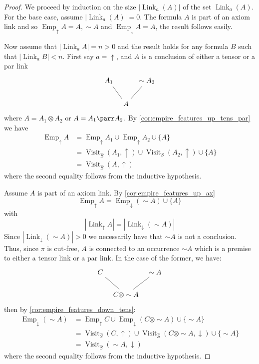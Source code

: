 \documentclass[12pt]{article}
\theoremstyle{plain}
\theoremstyle{definition}
\newcommand{\negation}{\sim}
\begin{document}
\begin{proof}
We proceed by induction on the size $|\operatorname{Link}_a(A)|$ of the set $\operatorname{Link}_a(A)$. For the base case, assume $|\operatorname{Link}_a(A)| = 0$. The formula $A$ is part of an axiom link and so $\operatorname{Emp}_{\uparrow}A = A, \negation A$ and $\operatorname{Emp}_{\downarrow}A = A$, the result follows easily.

Now assume that $|\operatorname{Link}_a A| = n > 0$ and the result holds for any formula $B$ such that $|\operatorname{Link}_aB| < n$. First say $a = \uparrow$, and $A$ is a conclusion of either a tensor or a par link
\[
\begin{tikzcd}[column sep = tiny]
A_1\arrow[dr,dash] && \negation A_2\arrow[dl,dash]\\
& A
\end{tikzcd}
\]
where $A = A_1 \otimes A_2$ or $A = A_1 \parr A_2$. By \eqref{cor:empire_features_up_tens_par} we have
\begin{align*}
    \operatorname{Emp}_{\uparrow}A &= \operatorname{Emp}_{\uparrow}A_1 \cup \operatorname{Emp}_{\uparrow}A_2 \cup \lbrace A\rbrace\\
    &= \operatorname{Visit}_{\hat{S}}(A_1,\uparrow) \cup \operatorname{Visit}_S(A_2,\uparrow) \cup \lbrace A \rbrace\\
    &= \operatorname{Visit}_{\hat{S}}(A, \uparrow)
\end{align*}
where the second equality follows from the inductive hypothesis.

Assume $A$ is part of an axiom link. By \eqref{cor:empire_features_up_ax}
\begin{equation}
    \operatorname{Emp}_{\uparrow}A = \operatorname{Emp}_{\downarrow}(\negation A) \cup \lbrace A \rbrace
\end{equation}
with
\begin{equation}
    |\operatorname{Link}_{\uparrow}A| = |\operatorname{Link}_{\downarrow}(\negation A)|
\end{equation}
Since $|\operatorname{Link}_{\downarrow}(\negation A)| > 0$ we necessarily have that $\negation A$ is not a conclusion. Thus, since $\pi$ is cut-free, $A$ is connected to an occurrence $\negation A$ which is a premise to either a tensor link or a par link. In the case of the former, we have:
\[
\begin{tikzcd}[column sep = tiny]
C\arrow[dr,dash] && \negation A\arrow[dl,dash]\\
& C \otimes \negation A
\end{tikzcd}
\]
then by \eqref{cor:empire_features_down_tens}:
\begin{align*}
    \operatorname{Emp}_{\downarrow}(\negation A) &= \operatorname{Emp}_{\uparrow}C \cup \operatorname{Emp}_{\downarrow}(C \otimes \negation A) \cup \lbrace \negation A\rbrace\\
    &= \operatorname{Visit}_{\hat{S}}(C,\uparrow) \cup \operatorname{Visit}_{\hat{S}}(C \otimes \negation A,\downarrow) \cup \lbrace \negation A\rbrace\\
    &= \operatorname{Visit}_{\hat{S}}(\negation A, \downarrow)
\end{align*}
where the second equality follows from the inductive hypothesis.


\end{proof}
\end{document}
